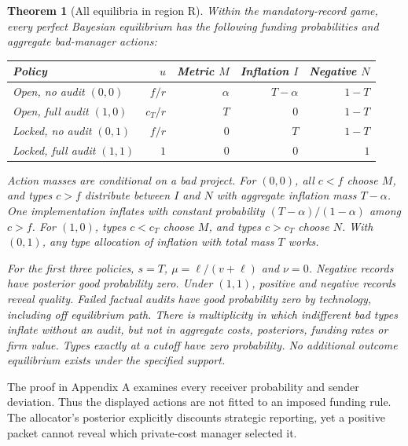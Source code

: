 \documentclass[11pt]{article}
\newtheorem{theorem}{Theorem}
\begin{document}
\begin{theorem}[All equilibria in region R]\label{thm:eq}
Within the mandatory-record game, every perfect Bayesian equilibrium has the following funding probabilities and aggregate bad-manager actions:
\begin{center}\small
\begin{tabular}{lrrrr}\toprule
Policy & $u$ & Metric $M$ & Inflation $I$ & Negative $N$\\\midrule
Open, no audit $(0,0)$ & $f/r$ & $\alpha$ & $T-\alpha$ & $1-T$\\
Open, full audit $(1,0)$ & $c_T/r$ & $T$ & $0$ & $1-T$\\
Locked, no audit $(0,1)$ & $f/r$ & $0$ & $T$ & $1-T$\\
Locked, full audit $(1,1)$ & $1$ & $0$ & $0$ & $1$\\\bottomrule
\end{tabular}
\end{center}
Action masses are conditional on a bad project. For $(0,0)$, all $c<f$ choose $M$, and types $c>f$ distribute between $I$ and $N$ with aggregate inflation mass $T-\alpha$. One implementation inflates with constant probability $(T-\alpha)/(1-\alpha)$ among $c>f$. For $(1,0)$, types $c<c_T$ choose $M$, and types $c>c_T$ choose $N$. With $(0,1)$, any type allocation of inflation with total mass $T$ works.

For the first three policies, $s=T$, $\mu=\ell/(v+\ell)$ and $\nu=0$. Negative records have posterior good probability zero. Under $(1,1)$, positive and negative records reveal quality. Failed factual audits have good probability zero by technology, including off equilibrium path. There is multiplicity in which indifferent bad types inflate without an audit, but not in aggregate costs, posteriors, funding rates or firm value. Types exactly at a cutoff have zero probability. No additional outcome equilibrium exists under the specified support.
\end{theorem}
The proof in Appendix A examines every receiver probability and sender deviation. Thus the displayed actions are not fitted to an imposed funding rule. The allocator's posterior explicitly discounts strategic reporting, yet a positive packet cannot reveal which private-cost manager selected it.
\end{document}
